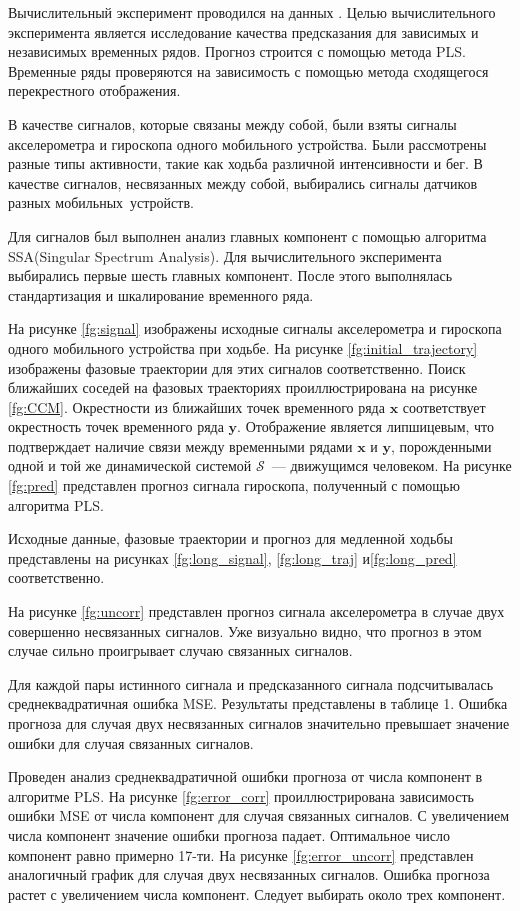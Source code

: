 \documentclass[12pt]{extarticle}
\newcommand{\bx}{\mathbf{x}}
\newcommand{\by}{\mathbf{y}}
\begin{document}
Вычислительный эксперимент проводился на данных \cite{data}.
Целью вычислительного эксперимента является исследование качества предсказания для зависимых и независимых временных рядов. Прогноз строится с помощью метода PLS. Временные ряды проверяются на зависимость с помощью метода сходящегося перекрестного отображения.


В качестве сигналов, которые связаны между собой, были взяты сигналы акселерометра и гироскопа одного мобильного устройства. Были рассмотрены разные типы активности, такие как ходьба различной интенсивности и бег. В качестве сигналов, несвязанных между собой, выбирались сигналы датчиков разных мобильных~устройств.

Для сигналов был выполнен анализ главных компонент с помощью алгоритма SSA(Singular Spectrum Analysis). Для вычислительного эксперимента выбирались первые шесть главных компонент. После этого выполнялась стандартизация и шкалирование временного ряда.

На рисунке \eqref{fg:signal} изображены исходные сигналы акселерометра и гироскопа одного мобильного устройства при ходьбе. На рисунке \eqref{fg:initial_trajectory} изображены фазовые траектории для этих сигналов соответственно. Поиск ближайших соседей на фазовых траекториях проиллюстрирована на рисунке \eqref{fg:CCM}. Окрестности из ближайших точек временного ряда $\bx$ соответствует окрестность точек временного ряда $\by$. Отображение является липшицевым, что подтверждает наличие связи между временными рядами $\bx$ и $\by$, порожденными одной и той же динамической системой $\mathcal{S}$~--- движущимся человеком. На рисунке \eqref{fg:pred} представлен прогноз сигнала гироскопа, полученный с помощью алгоритма PLS.  

Исходные данные, фазовые траектории и прогноз для медленной ходьбы представлены на рисунках \eqref{fg:long_signal}, \eqref{fg:long_traj} и\eqref{fg:long_pred} соответственно.

На рисунке \eqref{fg:uncorr} представлен прогноз сигнала акселерометра в случае двух совершенно несвязанных сигналов. Уже визуально видно, что прогноз в этом случае сильно проигрывает случаю связанных сигналов.


Для каждой пары истинного сигнала и предсказанного сигнала подсчитывалась среднеквадратичная ошибка MSE. Результаты представлены в таблице 1. Ошибка прогноза для случая двух несвязанных сигналов значительно превышает значение ошибки для случая связанных сигналов.

Проведен анализ среднеквадратичной ошибки прогноза от числа компонент в алгоритме PLS. На рисунке \eqref{fg:error_corr} проиллюстрирована зависимость ошибки MSE от числа компонент для случая связанных сигналов. С увеличением числа компонент значение ошибки прогноза падает. Оптимальное число компонент равно примерно 17-ти. На рисунке \eqref{fg:error_uncorr} представлен аналогичный график для случая двух несвязанных сигналов. Ошибка прогноза растет с увеличением числа компонент. Следует выбирать около трех компонент. 
\end{document}
